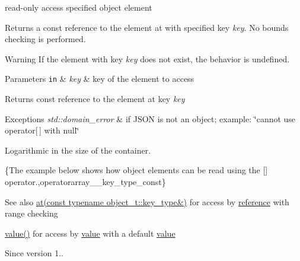 read-\/only access specified object element 

Returns a const reference to the element at with specified key {\itshape key}. No bounds checking is performed.

\begin{DoxyWarning}{Warning}
If the element with key {\itshape key} does not exist, the behavior is undefined.
\end{DoxyWarning}

\begin{DoxyParams}[1]{Parameters}
\mbox{\tt in}  & {\em key} & key of the element to access\\
\hline
\end{DoxyParams}
\begin{DoxyReturn}{Returns}
const reference to the element at key {\itshape key} 
\end{DoxyReturn}

\begin{DoxyExceptions}{Exceptions}
{\em std\+::domain\+\_\+error} & if J\+S\+ON is not an object; example\+: {\ttfamily \char`\"{}cannot use
operator\mbox{[}$\,$\mbox{]} with null\char`\"{}}\\
\hline
\end{DoxyExceptions}
Logarithmic in the size of the container.

\{The example below shows how object elements can be read using the {\ttfamily \mbox{[}\mbox{]}} operator.,operatorarray\+\_\+\+\_\+key\+\_\+type\+\_\+const\}

\begin{DoxySeeAlso}{See also}
\hyperlink{a00025_a7ed92d56cb313b243c1917696ffdf074}{at(const typename object\+\_\+t\+::key\+\_\+type\&)} for access by \hyperlink{a00025_a3ec8e17be8732fe436e9d6733f52b7a3}{reference} with range checking 

\hyperlink{a00025_a0a2cbbd95862a623e7dc5c37e67dead0}{value()} for access by \hyperlink{a00025_a0a2cbbd95862a623e7dc5c37e67dead0}{value} with a default \hyperlink{a00025_a0a2cbbd95862a623e7dc5c37e67dead0}{value}
\end{DoxySeeAlso}
\begin{DoxySince}{Since}
version 1.. 
\end{DoxySince}
